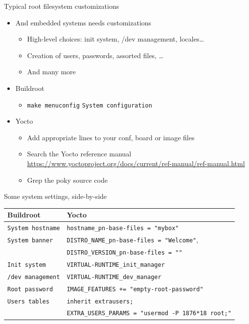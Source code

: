 \documentclass[xetex,table,aspectratio=43]{beamer}
\newcommand{\bg}[1]{
  \usebackgroundtemplate{
    \texttt{[image: images/bg-\#1.png]}
  }
}
\begin{document}
\bg{both}
\begin{frame}{Typical root filesystem customizations}
  \begin{itemize}
  \item And embedded systems needs customizations
    \begin{itemize}
    \item High-level choices: init system, /dev management, locales\dots
    \item Creation of users, passwords, assorted files, \dots
    \item And many more
    \end{itemize}
  \item Buildroot
    \begin{itemize}
    \item {\tt make menuconfig} \textrightarrow{} {\tt System
      configuration}
    \end{itemize}
  \item Yocto
    \begin{itemize}
    \item Add appropriate lines to your conf, board or image files
    \item Search the Yocto reference manual
      \url{https://www.yoctoproject.org/docs/current/ref-manual/ref-manual.html}
    \item Grep the poky source code
    \end{itemize}
  \end{itemize}
\end{frame}

\begin{frame}{Some system settings, side-by-side}
  \footnotesize
  \begin{table}
    \begin{tabular}{ll}
      \toprule
      Buildroot & Yocto\\
      \midrule
      {\tt System hostname} & {\tt hostname\_pn-base-files = "mybox"}\\
      {\tt System banner}   & {\tt DISTRO\_NAME\_pn-base-files = "Welcome"},\\
                            & {\tt DISTRO\_VERSION\_pn-base-files = ""}\\
      \midrule
      {\tt Init system}     & {\tt VIRTUAL-RUNTIME\_init\_manager}\\
      {\tt /dev management} & {\tt VIRTUAL-RUNTIME\_dev\_manager}\\
      \midrule
      {\tt Root password} & {\tt IMAGE\_FEATURES += "empty-root-password"}\\
      {\tt Users tables} & {\tt inherit extrausers;}\\
                         & {\tt EXTRA\_USERS\_PARAMS = "usermod -P 1876*18 root;"}\\
      \bottomrule
    \end{tabular}
  \end{table}
\end{frame}
\end{document}
